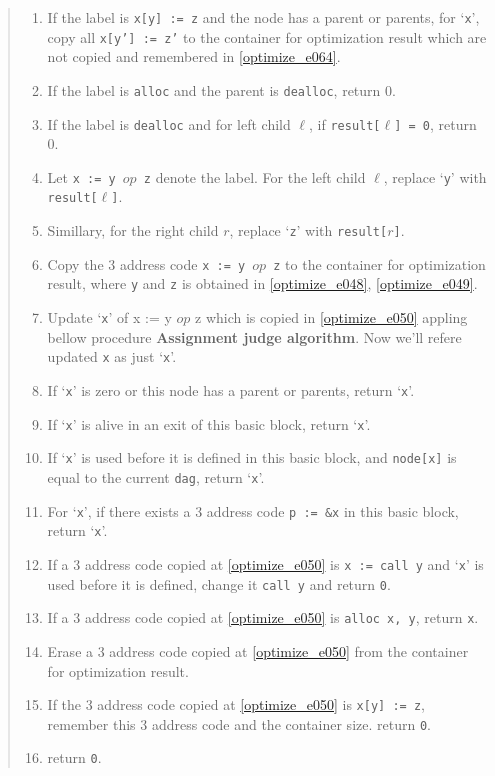 \begin{quote}
\begin{enumerate}
\item \label{optimize_e108}
      If the label is {\tt{x[y] := z}} and the node has a parent or
      parents, for `{\tt{x}}', copy all {\tt{x[y'] := z'}} to
      the container  for optimization result
      which are not copied and remembered in \ref{optimize_e064}.
\item If the label is {\tt{alloc}} and the parent is {\tt{dealloc}},
      return 0.
\item If the label is {\tt{dealloc}} and for left child $\ell$,
      if {\tt{result[$\ell$] = 0}}, return 0.
\item \label{optimize_e048}
      Let {\tt{x := y $op$ z}} denote the label.
      For the left child $\ell$, replace `{\tt{y}}' with
      {\tt{result[$\ell$]}}.
\item \label{optimize_e049}
      Simillary, for the right child $r$, replace `{\tt{z}}'
      with {\tt{result[$r$]}}.
\item \label{optimize_e050}
      Copy the 3 address code {\tt{x := y $op$ z}} to the container
      for optimization result, where {\tt{y}} and {\tt{z}}
      is obtained in \ref{optimize_e048}, \ref{optimize_e049}.
\item Update `{\tt{x}}' of {x := y $op$ z} which is copied in
      \ref{optimize_e050} appling bellow procedure
      {\bf Assignment judge algorithm}. Now we'll refere updated
       {\tt{x}} as just `{\tt{x}}'.
\item  If `{\tt{x}}' is zero or this node has a parent or parents,
       return `{\tt{x}}'.
\item If `{\tt{x}}' is alive in an exit of this basic block,
      return `{\tt{x}}'.
\item If `{\tt{x}}' is used before it is defined
      in this basic block, and  {\tt{node[x]}} is equal to
      the current {\tt{dag}}, return `{\tt{x}}'.
\item For `{\tt{x}}', if there exists a 3 address code {\tt{p := \&x}} in this
      basic block, return `{\tt{x}}'.
\item \label{optimize_e057}
      If a 3 address code copied at \ref{optimize_e050} is
      {\tt{x := call y}} and `{\tt{x}}' is used before it is
      defined, change it {\tt{call y}} and return {\tt{0}}.
\item If a 3 address code copied at \ref{optimize_e050} is
      {\tt{alloc x, y}}, return {\tt{x}}.
\item \label{optimize_e056}
      Erase a 3 address code copied at \ref{optimize_e050} 
      from the container for optimization result.
\item \label{optimize_e064}
      If the 3 address code copied at \ref{optimize_e050} is
      {\tt{x[y] := z}}, remember this 3 address code and the
      container size. return {\tt{0}}.
\item return {\tt{0}}.
\end{enumerate}
\end{quote}

